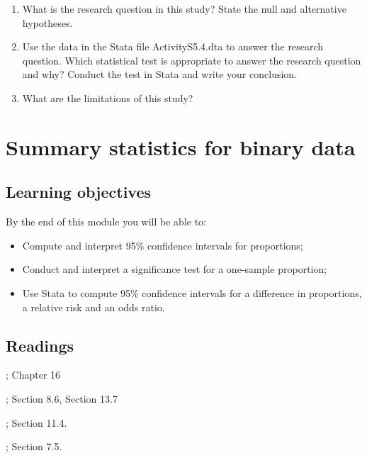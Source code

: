 \documentclass[
]{memoir}
\providecommand{\tightlist}{%
  \setlength{\itemsep}{0pt}\setlength{\parskip}{0pt}}
\begin{document}
\begin{enumerate}
\def\labelenumi{\alph{enumi})}
\tightlist
\item
  What is the research question in this study? State the null and alternative hypotheses.
\item
  Use the data in the Stata file ActivityS5.4.dta to answer the research question. Which statistical test is appropriate to answer the research question and why? Conduct the test in Stata and write your conclusion.
\item
  What are the limitations of this study?
\end{enumerate}

\hypertarget{summary-statistics-for-binary-data}{%
\chapter{Summary statistics for binary data}\label{summary-statistics-for-binary-data}}

\hypertarget{learning-objectives-5}{%
\section*{Learning objectives}\label{learning-objectives-5}}

By the end of this module you will be able to:

\begin{itemize}
\tightlist
\item
  Compute and interpret 95\% confidence intervals for proportions;
\item
  Conduct and interpret a significance test for a one-sample proportion;
\item
  Use Stata to compute 95\% confidence intervals for a difference in proportions, a relative risk and an odds ratio.
\end{itemize}

\hypertarget{readings-5}{%
\section*{Readings}\label{readings-5}}

\citep{kirkwood_sterne01}; Chapter 16

\citep{bland15}; Section 8.6, Section 13.7

\citep{juul_frydenberg14}; Section 11.4.

\citep{acock10}; Section 7.5.
\end{document}
